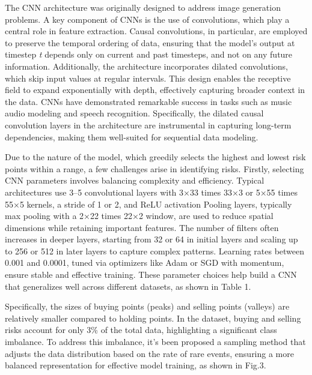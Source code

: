 \begin{multicols}{2}
The CNN architecture was originally designed to address image generation
problems. A key component of CNNs is the use of convolutions, which play
a central role in feature extraction. Causal convolutions, in
particular, are employed to preserve the temporal ordering of data,
ensuring that the model's output at timestep \emph{t} depends only on
current and past timesteps, and not on any future information.
Additionally, the architecture incorporates dilated convolutions, which
skip input values at regular intervals. This design enables the
receptive field to expand exponentially with depth, effectively
capturing broader context in the data. CNNs have demonstrated remarkable
success in tasks such as music audio modeling and speech recognition.
Specifically, the dilated causal convolution layers in the architecture
are instrumental in capturing long-term dependencies, making them
well-suited for sequential data modeling.

Due to the nature of the model, which greedily selects the highest and
lowest risk points within a range, a few challenges arise in identifying
risks. Firstly, selecting CNN parameters involves balancing complexity
and efficiency. Typical architectures use 3--5 convolutional layers with
3×33 times 33×3 or 5×55 times 55×5 kernels, a stride of 1 or 2, and ReLU
activation Pooling layers, typically max pooling with a 2×22 times 22×2
window, are used to reduce spatial dimensions while retaining important
features. The number of filters often increases in deeper layers,
starting from 32 or 64 in initial layers and scaling up to 256 or 512 in
later layers to capture complex patterns. Learning rates between 0.001
and 0.0001, tuned via optimizers like Adam or SGD with momentum, ensure
stable and effective training. These parameter choices help build a CNN
that generalizes well across different datasets, as shown in Table 1.

Specifically, the sizes of buying points (peaks) and selling points
(valleys) are relatively smaller compared to holding points. In the
dataset, buying and selling risks account for only 3\% of the total
data, highlighting a significant class imbalance. To address this
imbalance, it's been proposed a sampling method that adjusts the data
distribution based on the rate of rare events, ensuring a more balanced
representation for effective model training, as shown in Fig.3.
\end{multicols}

